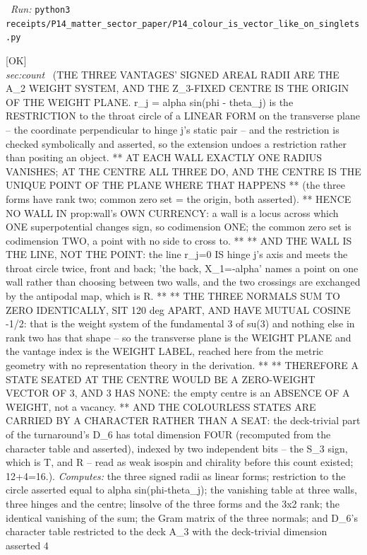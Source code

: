 \begin{description}
\ \emph{Run:} \texttt{python3 receipts/P14\_matter\_sector\_paper/P14\_colour\_is\_vector\_like\_on\_singlets.py}
\item[\rcptlabel{P14_the_centre_is_the_weight_origin}{P14R38}\textbf{P14R38}\quad\texttt{P14\_the\_centre\_is\_the\_weight\_origin}]\hfill\textsf{[OK]}\\
\textit{sec:count} \ (THE THREE VANTAGES' SIGNED AREAL RADII ARE THE A\_2 WEIGHT SYSTEM, AND THE Z\_3-FIXED CENTRE IS THE ORIGIN OF THE WEIGHT PLANE. r\_j = alpha sin(phi - theta\_j) is the RESTRICTION to the throat circle of a LINEAR FORM on the transverse plane -- the coordinate perpendicular to hinge j's static pair -- and the restriction is checked symbolically and asserted, so the extension undoes a restriction rather than positing an object. ** AT EACH WALL EXACTLY ONE RADIUS VANISHES; AT THE CENTRE ALL THREE DO, AND THE CENTRE IS THE UNIQUE POINT OF THE PLANE WHERE THAT HAPPENS ** (the three forms have rank two; common zero set = the origin, both asserted). ** HENCE NO WALL IN prop:wall's OWN CURRENCY: a wall is a locus across which ONE superpotential changes sign, so codimension ONE; the common zero set is codimension TWO, a point with no side to cross to. ** ** AND THE WALL IS THE LINE, NOT THE POINT: the line r\_j=0 IS hinge j's axis and meets the throat circle twice, front and back; 'the back, X\_1=-alpha' names a point on one wall rather than choosing between two walls, and the two crossings are exchanged by the antipodal map, which is R. ** ** THE THREE NORMALS SUM TO ZERO IDENTICALLY, SIT 120 deg APART, AND HAVE MUTUAL COSINE -1/2: that is the weight system of the fundamental 3 of su(3) and nothing else in rank two has that shape -- so the transverse plane is the WEIGHT PLANE and the vantage index is the WEIGHT LABEL, reached here from the metric geometry with no representation theory in the derivation. ** ** THEREFORE A STATE SEATED AT THE CENTRE WOULD BE A ZERO-WEIGHT VECTOR OF 3, AND 3 HAS NONE: the empty centre is an ABSENCE OF A WEIGHT, not a vacancy. ** AND THE COLOURLESS STATES ARE CARRIED BY A CHARACTER RATHER THAN A SEAT: the deck-trivial part of the turnaround's D\_6 has total dimension FOUR (recomputed from the character table and asserted), indexed by two independent bits -- the S\_3 sign, which is T, and R -- read as weak isospin and chirality before this count existed; 12+4=16.). 
\emph{Computes:} the three signed radii as linear forms; restriction to the circle asserted equal to alpha sin(phi-theta\_j); the vanishing table at three walls, three hinges and the centre; linsolve of the three forms and the 3x2 rank; the identical vanishing of the sum; the Gram matrix of the three normals; and D\_6's character table restricted to the deck A\_3 with the deck-trivial dimension asserted 4

\end{description}
